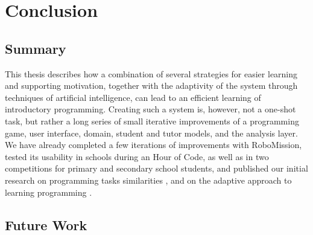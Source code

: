 \chapter{Conclusion}
\label{chap:conclusion}

\section{Summary}

This thesis describes how a combination of several strategies for easier learning and
supporting motivation, together with the adaptivity of the system
through techniques of artificial intelligence,
can lead to an efficient learning of introductory programming. %
Creating such a system is, however, not a one-shot task, but rather a long series
of small iterative improvements of a programming game, user interface,
domain, student and tutor models, and the analysis layer.
We have already completed a few iterations of improvements with
RoboMission,
tested its usability in schools during an Hour of Code,
as well as in two competitions for primary and secondary school students,
and published our initial research on programming tasks similarities \cite{alg.similarity},
and on the adaptive approach to learning programming \cite{robomission}.



\section{Future Work}

